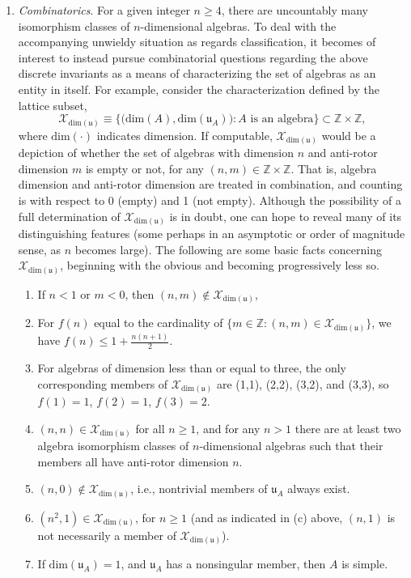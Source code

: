 \documentclass{amsart}
\numberwithin{equation}{section}
\theoremstyle{definition}
\numberwithin{theorem}{section}
\begin{document}
\begin{enumerate}
  \item {\it Combinatorics}. For a given integer $n\ge 4$, there are uncountably many isomorphism classes of $n$-dimensional algebras.  To deal with the accompanying unwieldy situation as regards classification, it becomes of interest to instead pursue combinatorial questions regarding the above discrete invariants as a means of characterizing the set of algebras as an entity in itself.   For example, consider the characterization defined by the lattice subset, \[ \mathcal{X}_{\text{dim}(\mathfrak{u})} \equiv \big\{\big(\text{dim}(A),\text{dim}(\mathfrak{u}_A)\big): A \text{ is an algebra}\big\} \subset \mathbb{Z}\times\mathbb{Z},\] where $\text{dim}(\cdot)$ indicates dimension.  If computable, $\mathcal{X}_{\text{dim}(\mathfrak{u})}$ would be a depiction of whether the set of algebras with dimension $n$ and anti-rotor dimension $m$ is empty or not, for any $(n,m)\in \mathbb{Z}\times\mathbb{Z}$.  That is, algebra dimension and anti-rotor dimension are treated in combination, and counting is with respect to 0 (empty) and 1 (not empty). Although the possibility of a full determination of $\mathcal{X}_{\text{dim}(\mathfrak{u})}$ is in doubt, one can hope to reveal many of its distinguishing features (some perhaps in an  asymptotic or order of magnitude sense, as $n$ becomes large). The following are some basic facts concerning $\mathcal{X}_{\text{dim}(\mathfrak{u})}$, beginning with the obvious and becoming progressively less so.

  \begin{enumerate} \item If $n<1$ or $m<0$, then $(n,m)\notin \mathcal{X}_{\text{dim}(\mathfrak{u})}$, \item  For $f(n)$ equal to the cardinality of $\{m\in\mathbb{Z}:(n,m)\in \mathcal{X}_{\text{dim}(\mathfrak{u})}\}$, we have $f(n)\le  1+\frac{n(n+1)}{2}$. \item For algebras of dimension less than or equal to three, the only corresponding members of $\mathcal{X}_{\text{dim}(\mathfrak{u})}$ are (1,1), (2,2), (3,2), and (3,3), so $f(1)=1$, $f(2)=1$, $f(3)=2$.  \item  $(n,n)\in \mathcal{X}_{\text{dim}(\mathfrak{u})}$ for all $n\ge 1$, and for any $n>1$ there are at least two algebra isomorphism classes of $n$-dimensional algebras such that their members all have anti-rotor dimension $n$.  \item $(n,0)\notin \mathcal{X}_{\text{dim}(\mathfrak{u})}$, i.e., nontrivial members of $\mathfrak{u}_A$ always exist.  \item  $(n^2,1)\in \mathcal{X}_{\text{dim}(\mathfrak{u})}$, for $n\ge 1$ (and as indicated in (c) above, $(n,1)$ is not necessarily a member of $\mathcal{X}_{\text{dim}(\mathfrak{u})}$). 
\item If $\text{dim}(\mathfrak{u}_A) = 1$, and $\mathfrak{u}_A$ has a nonsingular member, then $A$ is simple.
\end{enumerate}
  

\end{enumerate}
\end{document}
